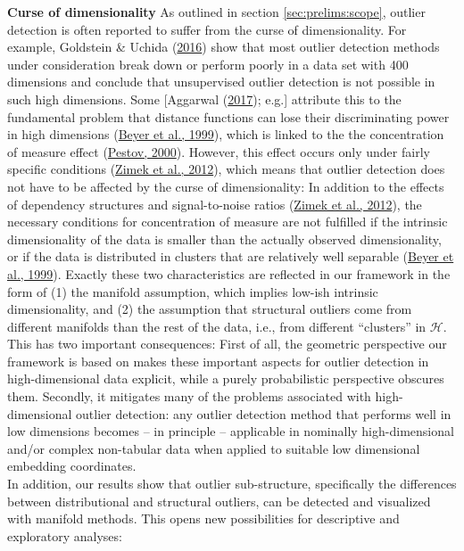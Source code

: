 \documentclass[
  10pt]{article}
\newcommand{\hdspace}{\mathcal{H}}
\begin{document}
\textbf{Curse of dimensionality} As outlined in section \ref{sec:prelims:scope}, outlier detection is often reported to suffer from the curse of dimensionality. For example, Goldstein \& Uchida (\protect\hyperlink{ref-goldstein2016comparative}{2016}) show that most outlier detection methods under consideration break down or perform poorly in a data set with 400 dimensions and conclude that unsupervised outlier detection is not possible in such high dimensions. Some {[}Aggarwal (\protect\hyperlink{ref-aggarwal2017outlier}{2017}); e.g.{]} attribute this to the fundamental problem that distance functions can lose their discriminating power in high dimensions (\protect\hyperlink{ref-beyer1999nearest}{Beyer et al., 1999}), which is linked to the the concentration of measure effect (\protect\hyperlink{ref-pestov2000geometry}{Pestov, 2000}). However, this effect occurs only under fairly specific conditions (\protect\hyperlink{ref-zimek2012survey}{Zimek et al., 2012}), which means that outlier detection does not have to be affected by the curse of dimensionality: In addition to the effects of dependency structures and signal-to-noise ratios (\protect\hyperlink{ref-zimek2012survey}{Zimek et al., 2012}), the necessary conditions for concentration of measure are not fulfilled if the intrinsic dimensionality of the data is smaller than the actually observed dimensionality, or if the data is distributed in clusters that are relatively well separable (\protect\hyperlink{ref-beyer1999nearest}{Beyer et al., 1999}). Exactly these two characteristics are reflected in our framework in the form of (1) the manifold assumption, which implies low-ish intrinsic dimensionality, and (2) the assumption that structural outliers come from different manifolds than the rest of the data, i.e., from different ``clusters'' in \(\hdspace\). This has two important consequences: First of all, the geometric perspective our framework is based on makes these important aspects for outlier detection in high-dimensional data explicit, while a purely probabilistic perspective obscures them. Secondly, it mitigates many of the problems associated with high-dimensional outlier detection: any outlier detection method that performs well in low dimensions becomes -- in principle -- applicable in nominally high-dimensional and/or complex non-tabular data when applied to suitable low dimensional embedding coordinates.\\
In addition, our results show that outlier sub-structure, specifically the differences between distributional and structural outliers, can be detected and visualized with manifold methods. This opens new possibilities for descriptive and exploratory analyses:\\
\end{document}

